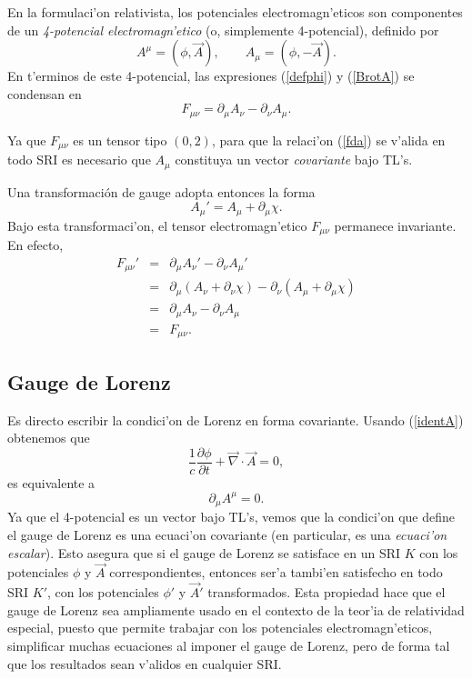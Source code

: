 En la formulaci'on relativista, los potenciales electromagn'eticos son componentes de un  \textit{4-potencial electromagn'etico} (o, simplemente 4-potencial), definido por
\begin{equation}
A^\mu =(\phi,\vec{A}), \qquad A_\mu =(\phi,-\vec{A}). \label{identA}
\end{equation}
En t'erminos de este 4-potencial, las expresiones (\ref{defphi}) y (\ref{BrotA}) se condensan en
\begin{equation}
\boxed{F_{\mu \nu}=\partial_\mu A_{\nu}-\partial_{\nu}A_\mu.} \label{fda}
\end{equation}

Ya que $F_{\mu\nu}$ es un tensor tipo $(0,2)$, para que la relaci'on (\ref{fda})
se v'alida en todo SRI es necesario que $A_\mu$ constituya un vector
\textit{covariante} bajo TL's.

Una transformaci\'on de gauge adopta entonces la forma
\begin{equation}
\boxed{A_\mu' = A_\mu  + \partial_\mu  \chi .}
\end{equation}
Bajo esta transformaci'on, el tensor electromagn'etico $F_{\mu \nu}$ permanece
invariante. En efecto,
\begin{eqnarray}
F_{\mu\nu}'&=&\partial_\mu A_{\nu}'-\partial_{\nu}A_\mu '  \\
&=&\partial_\mu (A_{\nu}+\partial_{\nu}
\chi)-\partial_{\nu}(A_\mu +\partial_\mu  \chi)\\
&=&\partial_\mu A_{\nu}-\partial_{\nu}A_\mu  \\
&=&F_{\mu \nu}.
\end{eqnarray}

\subsection{Gauge de Lorenz}
Es directo escribir la condici'on de Lorenz en forma covariante. Usando
(\ref{identA}) obtenemos que
\begin{equation}
\frac{1}{c}\frac{\partial\phi}{\partial t}+\vec{\nabla}\cdot\vec{A}=0,
\end{equation}
es equivalente a
\begin{equation}
\partial_\mu A^\mu=0. \label{gLA}
\end{equation}
Ya que el 4-potencial es un vector bajo TL's, vemos que la condici'on que define el gauge de Lorenz es una ecuaci'on covariante (en particular, es una \textit{ecuaci'on escalar}). Esto asegura que si el gauge de Lorenz se satisface en un SRI $K$ con los potenciales $\phi$ y $\vec{A}$ correspondientes, entonces ser'a tambi'en satisfecho en todo SRI $K'$, con los potenciales $\phi'$ y $\vec{A}'$ transformados. Esta propiedad hace que el gauge de Lorenz sea ampliamente usado en el contexto de la teor'ia de relatividad especial, puesto que permite trabajar con los potenciales electromagn'eticos, simplificar muchas ecuaciones al imponer el gauge de Lorenz, pero de forma tal que los resultados sean v'alidos en cualquier SRI.

